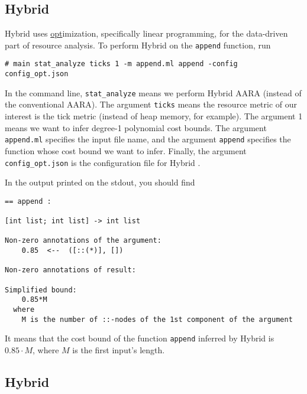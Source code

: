 \subsection{Hybrid \Opt{}}

Hybrid \Opt{} uses \underline{opt}imization, specifically linear programming,
for the data-driven part of resource analysis.
%
To perform Hybrid \Opt{} on the \texttt{append} function, run
\begin{verbatim}
# main stat_analyze ticks 1 -m append.ml append -config config_opt.json
\end{verbatim}
%
In the command line, \texttt{stat\_analyze} means we perform Hybrid AARA
(instead of the conventional AARA).
%
The argument \texttt{ticks} means the resource metric of our interest is the
tick metric (instead of heap memory, for example).
%
The argument 1 means we want to infer degree-1 polynomial cost bounds.
%
The argument \texttt{append.ml} specifies the input file name, and the argument
\texttt{append} specifies the function whose cost bound we want to infer.
%
Finally, the argument \texttt{config\_opt.json} is the configuration file for
Hybrid \Opt{}.

In the output printed on the stdout, you should find
\begin{verbatim}
== append :

[int list; int list] -> int list

Non-zero annotations of the argument:
    0.85  <--  ([::(*)], [])

Non-zero annotations of result:

Simplified bound:
    0.85*M
  where
    M is the number of ::-nodes of the 1st component of the argument
\end{verbatim}
%
It means that the cost bound of the function \texttt{append} inferred by Hybrid
\Opt{} is $0.85 \cdot M$, where $M$ is the first input's length.

\subsection{Hybrid \BayesWC{}}

